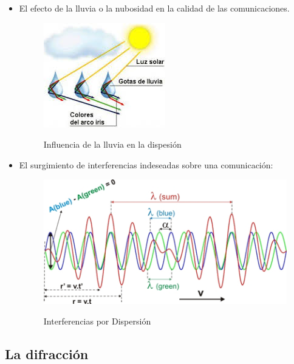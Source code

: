 \begin{itemize}
	\item  El efecto de la lluvia o la nubosidad en la calidad de las comunicaciones.
	
	\begin{figure}[h!]
		\captionsetup{justification = raggedright, singlelinecheck = false}
		\caption{Influencia de la lluvia en la dispesión} 
		\centering
		\includegraphics[scale=1]{Imagenes/lluvia.png}
		\label{fig:lluvia}
	\end{figure}
	
	\item  El surgimiento de interferencias indeseadas sobre una comunicación:
	
	\begin{figure}[h!]
		\captionsetup{justification = raggedright, singlelinecheck = false}
		\caption{Interferencias por Dispersión} 
		\centering
		\includegraphics[scale=1]{Imagenes/Onda.png}
		\label{fig:Onda}
	\end{figure}
\end{itemize}
\subsection{La difracción}


